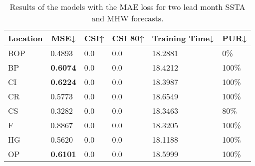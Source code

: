 \documentclass[11pt, a4paper]{article}
\begin{document}
\begin{table}[H]
\centering
\small
\caption{Results of the models with the MAE loss for two lead month SSTA and MHW forecasts.}
\begin{tabular}{llllll}
\multicolumn{1}{c}{\textbf{Location}} & \multicolumn{1}{c}{\textbf{MSE↓}} & \multicolumn{1}{c}{\textbf{CSI↑}} & \multicolumn{1}{c}{\textbf{CSI 80↑}} & \multicolumn{1}{c}{\textbf{Training Time↓}} & \multicolumn{1}{c}{\textbf{PUR↓}} \\ \hline
BOP                         & 0.4893                            & 0.0                               & 0.0                                  & 18.2881                                     & 0\%                               \\
BP                        & \textbf{0.6074}                   & 0.0                               & 0.0                                  & 18.4212                                     & 100\%                             \\
CI                        & \textbf{0.6224}                   & 0.0                               & 0.0                                  & 18.3987                                     & 100\%                             \\
CR                           & 0.5773                            & 0.0                               & 0.0                                  & 18.6549                                     & 100\%                             \\
CS                           & 0.3282                            & 0.0                               & 0.0                                  & 18.3463                                     & 80\%                              \\
F                             & 0.8867                            & 0.0                               & 0.0                                  & 18.3205                                     & 100\%                             \\
HG                          & 0.5620                            & 0.0                               & 0.0                                  & 18.1188                                     & 100\%                             \\
OP                       & \textbf{0.6101}                   & 0.0                               & 0.0                                  & 18.5999                                     & 100\%                             \\

\end{tabular}
\end{table}
\end{document}
